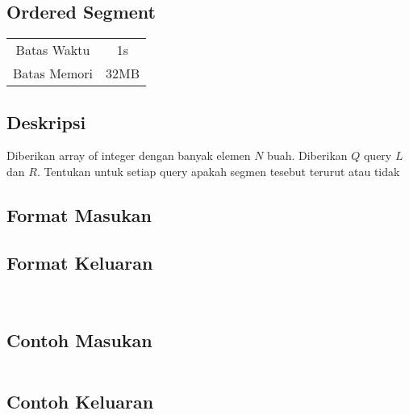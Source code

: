 \documentclass{article}
\begin{document}
\begin{center}
    \section*{Ordered Segment} %

    \begin{tabular}{ | c c | }
        \hline
        Batas Waktu  & 1s \\    %
        Batas Memori & 32MB \\  %
        \hline
    \end{tabular}
\end{center}

\subsection*{Deskripsi}

Diberikan array of integer dengan banyak elemen $N$ buah.
Diberikan $Q$ query $L$ dan $R$.
Tentukan untuk setiap query apakah segmen tesebut terurut atau tidak

\subsection*{Format Masukan}



\subsection*{Format Keluaran}

\\

\begin{multicols}{2}
\subsection*{Contoh Masukan}
\begin{lstlisting}

\end{lstlisting}
\columnbreak
\subsection*{Contoh Keluaran}
\begin{lstlisting}

\end{lstlisting}
\vfill
\null
\end{multicols}


\pagebreak
\end{document}
